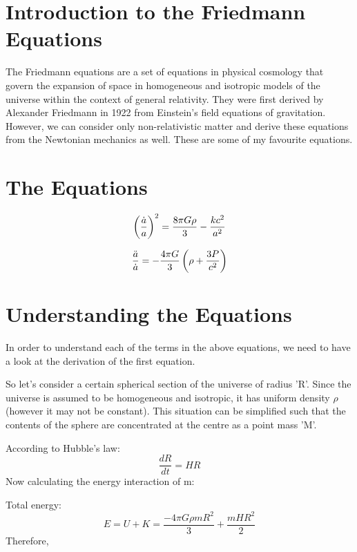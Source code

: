 \section*{Introduction to the Friedmann Equations}

The Friedmann equations are a set of equations in physical cosmology that govern the expansion of space in homogeneous and isotropic models of the universe within the context of general relativity. They were first derived by Alexander Friedmann in 1922 from Einstein’s field equations of gravitation. However, we can consider only non-relativistic matter and derive these equations from the Newtonian mechanics as well. These are some of my favourite equations.


\section*{The Equations}

\begin{equation}
    \centering
    \left(\frac{\Dot{a}}{a}\right)^2 = \frac{8 \pi G \rho}{3} - \frac{kc^2}{a^2}
\end{equation}

\begin{equation}
    \frac{\Ddot{a}}{\Dot{a}} = -\frac{4 \pi G}{3}\left(\rho + \frac{3P}{c^2}\right)
\end{equation}

\section*{Understanding the Equations}

In order to understand each of the terms in the above equations, we need to have a look at the derivation of the first equation.

So let's consider a certain spherical section of the universe of radius 'R'. Since the universe is assumed to be homogeneous and isotropic, it has uniform density $\rho$ (however it may not be constant). This situation can be simplified such that the contents of the sphere are concentrated at the centre as a point mass 'M'.

According to Hubble's law:
\begin{equation*}
    \frac{dR}{dt}=HR
\end{equation*}
Now calculating the energy interaction of m:

Total energy:
\begin{equation*}
    E = U + K = \frac{-4 \pi G \rho mR^2}{3} + \frac{m{HR}^2}{2}
\end{equation*}
Therefore,


